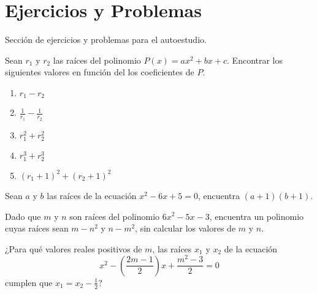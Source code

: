 \section{Ejercicios y Problemas}
{
    Sección de ejercicios y problemas para el autoestudio.

    \begin{exercise}
        Sean $r_1$ y $r_2$ las raíces del polinomio $P(x) = ax^2 + bx + c$. Encontrar los siguientes valores en función del los coeficientes de $P.$
        \begin{multicols}{3}
            \begin{enumerate}
                \item $r_1 - r_2$
                \item $\frac{1}{r_1} - \frac{1}{r_2}$
                \item $r^2_1 + r^2_2$
                \item $r^3_1 + r^3_2$
                \item $(r_1 + 1)^2 + (r_2 + 1)^2$
            \end{enumerate}
        \end{multicols}
    \end{exercise}

    \begin{section-problem}
        Sean $a$ y $b$ las raíces de la ecuación $x^2 - 6x + 5 = 0$, encuentra $(a + 1)(b + 1).$
    \end{section-problem}

    \begin{section-problem}
        Dado que $m$ y $n$ son raíces del polinomio $6x^2 - 5x - 3$, encuentra un polinomio cuyas raíces sean
        $m - n^2$ y $n - m^2$, sin calcular los valores de $m$ y $n$.
    \end{section-problem}

    \begin{section-problem}
        ¿Para qué valores reales positivos de $m$, las raíces $x_1$ y $x_2$ de la ecuación
        \[x^2 - \left( \frac{2m - 1}{2} \right)x  + \frac{m^2 - 3}{2} = 0\]
        cumplen que $x_1 = x_2 - \frac{1}{2}$?
    \end{section-problem}

}\label{sec:ejercicios-y-problemas}